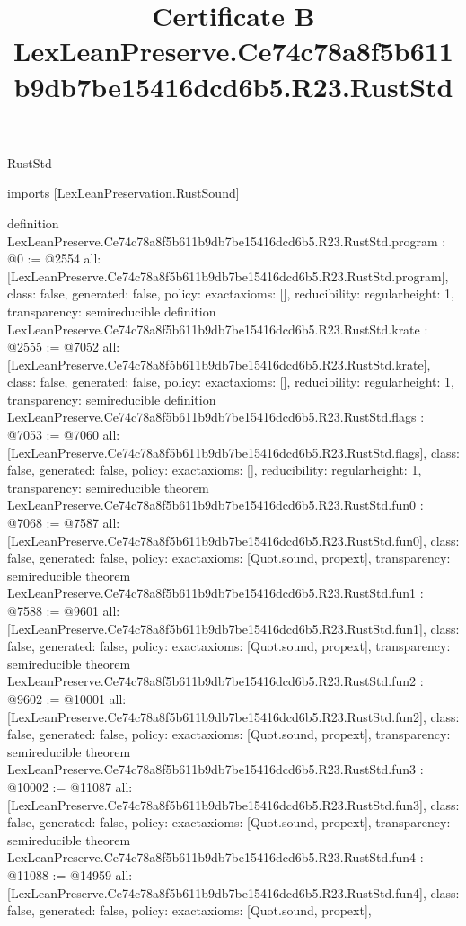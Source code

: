 \begin{lexlean}{RustStd}
\title{Certificate B LexLeanPreserve.Ce74c78a8f5b611b9db7be15416dcd6b5.R23.RustStd}
\begin{coremodule}
imports [LexLeanPreservation.RustSound]

definition LexLeanPreserve.Ce74c78a8f5b611b9db7be15416dcd6b5.R23.RustStd.program : @0 := @2554 {
  all: [LexLeanPreserve.Ce74c78a8f5b611b9db7be15416dcd6b5.R23.RustStd.program],
  class: false,
  generated: false,
  policy: exact{axioms: []},
  reducibility: regular{height: 1},
  transparency: semireducible
}
definition LexLeanPreserve.Ce74c78a8f5b611b9db7be15416dcd6b5.R23.RustStd.krate : @2555 := @7052 {
  all: [LexLeanPreserve.Ce74c78a8f5b611b9db7be15416dcd6b5.R23.RustStd.krate],
  class: false,
  generated: false,
  policy: exact{axioms: []},
  reducibility: regular{height: 1},
  transparency: semireducible
}
definition LexLeanPreserve.Ce74c78a8f5b611b9db7be15416dcd6b5.R23.RustStd.flags : @7053 := @7060 {
  all: [LexLeanPreserve.Ce74c78a8f5b611b9db7be15416dcd6b5.R23.RustStd.flags],
  class: false,
  generated: false,
  policy: exact{axioms: []},
  reducibility: regular{height: 1},
  transparency: semireducible
}
theorem LexLeanPreserve.Ce74c78a8f5b611b9db7be15416dcd6b5.R23.RustStd.fun0 : @7068 := @7587 {
  all: [LexLeanPreserve.Ce74c78a8f5b611b9db7be15416dcd6b5.R23.RustStd.fun0],
  class: false,
  generated: false,
  policy: exact{axioms: [Quot.sound, propext]},
  transparency: semireducible
}
theorem LexLeanPreserve.Ce74c78a8f5b611b9db7be15416dcd6b5.R23.RustStd.fun1 : @7588 := @9601 {
  all: [LexLeanPreserve.Ce74c78a8f5b611b9db7be15416dcd6b5.R23.RustStd.fun1],
  class: false,
  generated: false,
  policy: exact{axioms: [Quot.sound, propext]},
  transparency: semireducible
}
theorem LexLeanPreserve.Ce74c78a8f5b611b9db7be15416dcd6b5.R23.RustStd.fun2 : @9602 := @10001 {
  all: [LexLeanPreserve.Ce74c78a8f5b611b9db7be15416dcd6b5.R23.RustStd.fun2],
  class: false,
  generated: false,
  policy: exact{axioms: [Quot.sound, propext]},
  transparency: semireducible
}
theorem LexLeanPreserve.Ce74c78a8f5b611b9db7be15416dcd6b5.R23.RustStd.fun3 : @10002 := @11087 {
  all: [LexLeanPreserve.Ce74c78a8f5b611b9db7be15416dcd6b5.R23.RustStd.fun3],
  class: false,
  generated: false,
  policy: exact{axioms: [Quot.sound, propext]},
  transparency: semireducible
}
theorem LexLeanPreserve.Ce74c78a8f5b611b9db7be15416dcd6b5.R23.RustStd.fun4 : @11088 := @14959 {
  all: [LexLeanPreserve.Ce74c78a8f5b611b9db7be15416dcd6b5.R23.RustStd.fun4],
  class: false,
  generated: false,
  policy: exact{axioms: [Quot.sound, propext]},
}
\end{coremodule}
\end{lexlean}
